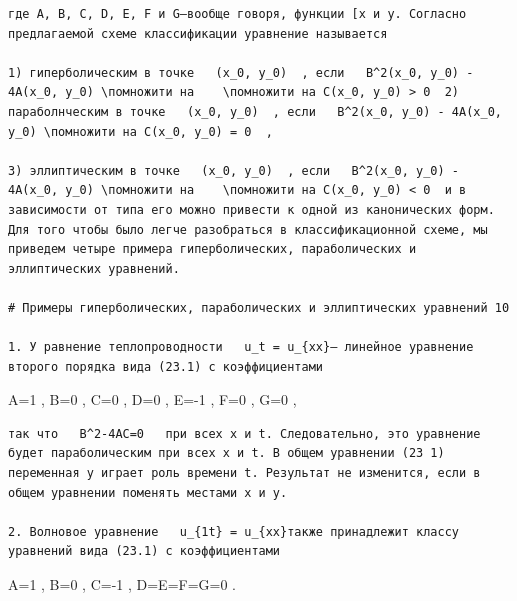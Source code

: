 \documentclass[
  ukrainian,
]{article}
\begin{document}
\begin{verbatim}
где A, B, C, D, E, F и G—вообще говоря, функции [x и y. Согласно предлагаемой схеме классификации уравнение называется

1) гиперболическим в точке   (x_0, y_0)  , если   B^2(x_0, y_0) - 4A(x_0, y_0) \помножити на    \помножити на C(x_0, y_0) > 0  2) параболнческим в точке   (x_0, y_0)  , если   B^2(x_0, y_0) - 4A(x_0, y_0) \помножити на C(x_0, y_0) = 0  ,

3) эллиптическим в точке   (x_0, y_0)  , если   B^2(x_0, y_0) - 4A(x_0, y_0) \помножити на    \помножити на C(x_0, y_0) < 0  и в зависимости от типа его можно привести к одной из канонических форм. Для того чтобы было легче разобраться в классификационной схеме, мы приведем четыре примера гиперболических, параболических и эллиптических уравнений.

# Примеры гиперболических, параболических и эллиптических уравнений 10

1. У равнение теплопроводности   u_t = u_{xx}— линейное уравнение второго порядка вида (23.1) с коэффициентами
\end{verbatim}

A=1 , B=0 , C=0 , D=0 , E=-1 , F=0 , G=0 ,

\begin{verbatim}
так что   B^2-4AC=0   при всех x и t. Следовательно, это уравнение будет параболическим при всех x и t. В общем уравнении (23 1) переменная y играет роль времени t. Результат не изменится, если в общем уравнении поменять местами x и y.

2. Волновое уравнение   u_{1t} = u_{xx}также принадлежит классу уравнений вида (23.1) с коэффициентами
\end{verbatim}

A=1 , B=0 , C=-1 , D=E=F=G=0 .
\end{document}
